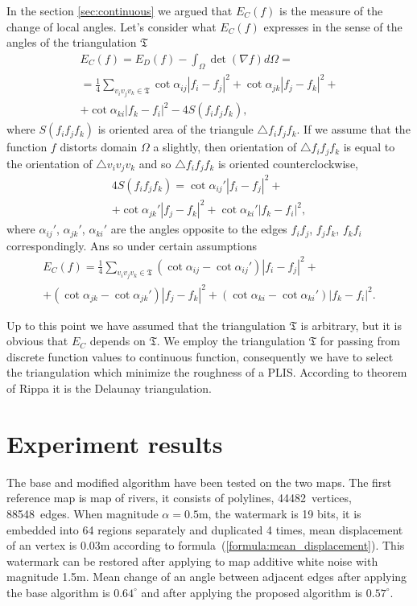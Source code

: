 \documentclass{article}
\begin{document}
In the section \ref{sec:continuous} we argued that $E_C(f)$ is the measure of the change of local angles. Let's consider what $E_C(f)$ expresses in the sense of the angles of the triangulation $\mathfrak{T}$ 
\begin{multline*}
  E_C(f) = E_D(f) - \int_{\Omega} \det (\nabla f) d\Omega = \\ = \frac{1}{4} \sum_{v_i v_j v_k \in \mathfrak{T}} \cot{\alpha_{ij}}|f_i - f_j|^2 + \cot{\alpha_{jk}}|f_j - f_k|^2 + \\
  + \cot{\alpha_{ki}}|f_k - f_i|^2 - 4S(f_i f_j f_k),
\end{multline*}
where $S(f_i f_j f_k)$ is oriented area of the triangule $\triangle f_i f_j f_k$. If we assume that the function $f$ distorts domain $\Omega$ a slightly, then orientation of $\triangle f_i f_j f_k$ is equal to 
the orientation of $\triangle v_i v_j v_k$ and so $\triangle f_i f_j f_k$ is oriented counterclockwise,
\begin{multline*}
  4 S(f_i f_j f_k) = \cot{\alpha_{ij}'}|f_i - f_j|^2 + \\
  + \cot{\alpha_{jk}'}|f_j - f_k|^2 + \cot{\alpha_{ki}'}|f_k - f_i|^2,
\end{multline*}
where $\alpha_{ij}'$, $\alpha_{jk}'$, $\alpha_{ki}'$ are the angles opposite to the edges $f_i f_j$, $f_j f_k$, $f_k f_i$ correspondingly. Ans so under certain assumptions
\begin{multline*}
  E_C(f) = \frac{1}{4} \sum_{v_i v_j v_k \in \mathfrak{T}} (\cot{\alpha_{ij}} - \cot{\alpha_{ij}'})|f_i - f_j|^2 + \\
  + (\cot{\alpha_{jk}} - \cot{\alpha_{jk}'})|f_j - f_k|^2 + (\cot{\alpha_{ki}} - \cot{\alpha_{ki}'})|f_k - f_i|^2.
\end{multline*}

Up to this point we have assumed that the triangulation $\mathfrak{T}$ is arbitrary, but it is obvious that $E_C$ depends on $\mathfrak{T}$. We employ the triangulation $\mathfrak{T}$ for passing 
from discrete function values to continuous function, consequently we have to select the triangulation which minimize the roughness of a PLIS. According to theorem of Rippa \cite{Rippa, Chen} 
it is the Delaunay triangulation.  

\section{Experiment results}
\label{sec:results}
The base and modified algorithm have been tested on the two maps. The first reference map is map of rivers, it consists of polylines, 44482~vertices, 88548~edges. When magnitude $\alpha = 0.5$m, 
the watermark is 19 bits, it is embedded into 64 regions separately and duplicated 4 times, mean displacement of an vertex is 0.03m according to formula~(\ref{formula:mean_displacement}). This watermark can be restored
after applying to map additive white noise with magnitude 1.5m. Mean change of an angle between adjacent edges after applying the base algorithm is $0.64^\circ$ and after applying the proposed algorithm is $0.57^\circ$.
\end{document}
